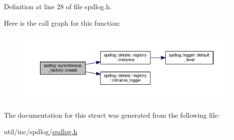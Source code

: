 Definition at line 28 of file spdlog.\+h.

Here is the call graph for this function\+:
\nopagebreak
\begin{figure}[H]
\begin{center}
\leavevmode
\includegraphics[width=350pt]{structspdlog_1_1synchronous__factory_acde09e4f9f33281ab1e663de5ef703b5_cgraph}
\end{center}
\end{figure}


The documentation for this struct was generated from the following file\+:\begin{DoxyCompactItemize}
\item 
util/inc/spdlog/\hyperlink{spdlog_8h}{spdlog.\+h}\end{DoxyCompactItemize}
